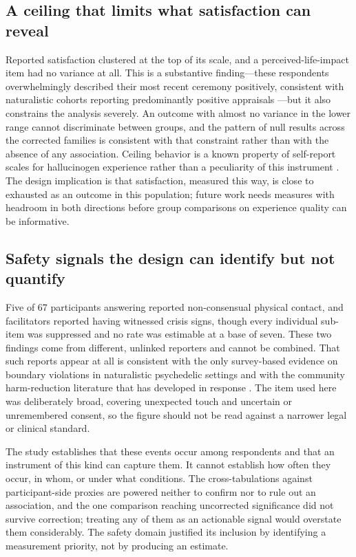 \documentclass[12pt]{article}
\begin{document}
\subsection{A ceiling that limits what satisfaction can reveal}

Reported satisfaction clustered at the top of its scale, and a perceived-life-impact item had no variance
at all. This is a substantive finding---these respondents overwhelmingly described their most recent
ceremony positively, consistent with naturalistic cohorts reporting predominantly positive appraisals
\citep{nayak2023naturalistic,ruffell2021ceremonial}---but it also constrains the analysis severely. An
outcome with almost no variance in the lower range cannot discriminate between groups, and the pattern of
null results across the corrected families is consistent with that constraint rather than with the absence
of any association. Ceiling behavior is a known property of self-report scales for hallucinogen experience
rather than a peculiarity of this instrument \citep{bouso2016measuring}. The design implication is that
satisfaction, measured this way, is close to exhausted as an outcome in this population; future work needs
measures with headroom in both directions before group comparisons on experience quality can be
informative.

\subsection{Safety signals the design can identify but not quantify}

Five of 67 participants answering reported non-consensual physical contact, and facilitators reported
having witnessed crisis signs, though every individual sub-item was suppressed and no rate was estimable at
a base of seven. These two findings come from different, unlinked reporters and cannot be combined. That
such reports appear at all is consistent with the only survey-based evidence on boundary violations in
naturalistic psychedelic settings \citep{kruger2025psychedelic} and with the community harm-reduction
literature that has developed in response \citep{peluso2020reflections}. The item used here was
deliberately broad, covering unexpected touch and uncertain or unremembered consent, so the figure should
not be read against a narrower legal or clinical standard.

The study establishes that these events occur among respondents and that an instrument of this kind can
capture them. It cannot establish how often they occur, in whom, or under what conditions. The
cross-tabulations against participant-side proxies are powered neither to confirm nor to rule out an
association, and the one comparison reaching uncorrected significance did not survive correction; treating
any of them as an actionable signal would overstate them considerably. The safety domain justified its
inclusion by identifying a measurement priority, not by producing an estimate.
\end{document}
